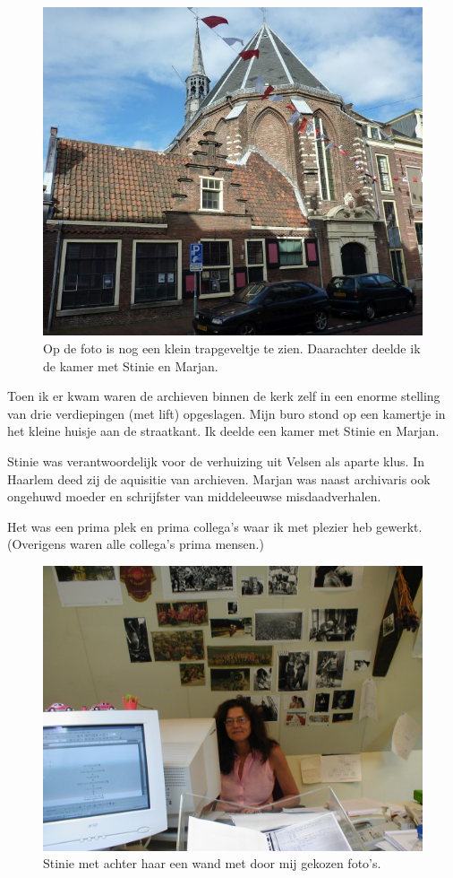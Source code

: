\documentclass[10pt,twoside, openright]{memoir}
\begin{document}
\begin{figure}
\includegraphics[width=\textwidth]{img/ch47/haarlem}
\caption*{\footnotesize Op de foto is nog een klein trapgeveltje te zien. Daarachter deelde ik de kamer met Stinie en Marjan.}
\end{figure}

Toen ik er kwam waren de archieven binnen de kerk zelf in een enorme stelling van drie verdiepingen (met lift) opgeslagen. Mijn buro stond op een kamertje in het kleine huisje aan de straatkant. Ik deelde een kamer met Stinie en Marjan.

Stinie was verantwoordelijk voor de verhuizing uit Velsen als aparte klus. In Haarlem deed zij de aquisitie van archieven. Marjan was naast archivaris ook ongehuwd moeder en schrijfster van middeleeuwse misdaadverhalen.

Het was een prima plek en prima collega’s waar ik met plezier heb gewerkt. (Overigens waren alle collega’s prima mensen.)

\begin{figure}
\includegraphics[width=\textwidth]{img/ch47/Stinie}
\caption*{\footnotesize Stinie met achter haar een wand met door mij gekozen foto's.}
\end{figure}
\end{document}
